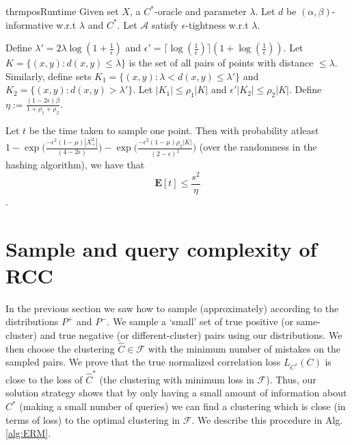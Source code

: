 \documentclass[12pt]{article}
\newcommand{\mb}{\mathbf}
\newcommand{\mc}{\mathcal}
\begin{document}
\begin{restatable}{thrm}{posRuntime}
\label{thm:posRuntime}
Given set $X$, a $C^*$-oracle and parameter $\lambda$. Let $d$ be $(\alpha, \beta)$-informative w.r.t $\lambda$ and $C^*$. Let $\mc A$ satisfy $\epsilon$-tightness w.r.t $\lambda$. 

Define $\lambda' = 2\lambda\log(1+\frac{1}{\epsilon})$ and $\epsilon' = \lceil \log(\frac{1}{\epsilon})\rceil (1+\log(\frac{1}{\epsilon}))$. Let $K = \{(x, y) : d(x, y) \le \lambda\}$ is the set of all pairs of points with distance $\le \lambda$. Similarly, define sets $K_1 = \{(x, y): \lambda < d(x, y) \le \lambda'\}$ and $K_2 = \{(x, y): d(x, y) > \lambda'\}$. Let $|K_1| \le \rho_1|K|$ and $\epsilon'|K_2| \le \rho_2|K|$. Define $\eta := \frac{(1-2\epsilon)\beta}{1+\rho_1+\rho_2}$.

Let $t$ be the time taken to sample one point. Then with probability atleast $1- \exp\Big(\frac{- \epsilon^2 (1-\mu)|X^2_+|}{(4-2\epsilon)}\Big)- \exp\Big(\frac{-\epsilon^2(1-\mu)\rho_2 |K|}{(2-\epsilon)^2}\Big)$ (over the randomness in the hashing algorithm), we have that $$\mb E[t] \le \frac{s^2}{\eta}$$. 
\end{restatable}

\section{Sample and query complexity of RCC}
\label{section:sampleAndQueryComplexity}
In the previous section we saw how to sample (approximately) according to the distributions $P^+$ and $P^-$. We sample a `small' set of true positive (or same-cluster) and true negative (or different-cluster) pairs using our distributions. We then choose the clustering $\hat C \in \mc F$ with the minimum number of mistakes on the sampled pairs. We prove that the true normalized correlation loss $L_{C^*}(C)$ is close to the loss of $\hat C^*$ (the clustering with minimum loss in $\mc F$). Thus, our solution strategy shows that by only having a small amount of information about $C^*$ (making a small number of queries) we can find a clustering which is close (in terms of loss) to the optimal clustering in $\mc F$. We describe this procedure in Alg. \ref{alg:ERM}. 
\end{document}
